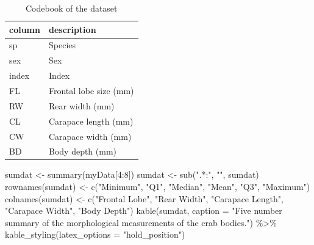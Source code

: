 \documentclass[
]{article}
\newenvironment{Shaded}{}{}
\newcommand{\AttributeTok}[1]{#1}
\newcommand{\DecValTok}[1]{#1}
\newcommand{\FunctionTok}[1]{#1}
\newcommand{\NormalTok}[1]{#1}
\newcommand{\OtherTok}[1]{\textcolor[rgb]{1.00,0.25,0.00}{#1}}
\newcommand{\SpecialCharTok}[1]{\textcolor[rgb]{0.00,0.50,0.50}{#1}}
\newcommand{\StringTok}[1]{\textcolor[rgb]{0.00,0.50,0.50}{#1}}
\begin{document}
\begin{table}[!h]

\caption{\label{tab:codebook}Codebook of the dataset}
\centering
\fontsize{10}{12}\selectfont
\begin{tabular}[t]{l|l}
\hline
column & description\\
\hline
sp & Species\\
\hline
sex & Sex\\
\hline
index & Index\\
\hline
FL & Frontal lobe size (mm)\\
\hline
RW & Rear width (mm)\\
\hline
CL & Carapace length (mm)\\
\hline
CW & Carapace width (mm)\\
\hline
BD & Body depth (mm)\\
\hline
\end{tabular}
\end{table}

\begin{Shaded}
\begin{Highlighting}[]
\NormalTok{sumdat }\OtherTok{\textless{}{-}} \FunctionTok{summary}\NormalTok{(myData[}\DecValTok{4}\SpecialCharTok{:}\DecValTok{8}\NormalTok{])}
\NormalTok{sumdat }\OtherTok{\textless{}{-}} \FunctionTok{sub}\NormalTok{(}\StringTok{".*:"}\NormalTok{, }\StringTok{""}\NormalTok{, sumdat)}
\FunctionTok{rownames}\NormalTok{(sumdat) }\OtherTok{\textless{}{-}}  \FunctionTok{c}\NormalTok{(}\StringTok{"Minimum"}\NormalTok{, }\StringTok{"Q1"}\NormalTok{, }\StringTok{"Median"}\NormalTok{, }\StringTok{"Mean"}\NormalTok{, }\StringTok{"Q3"}\NormalTok{, }\StringTok{"Maximum"}\NormalTok{)}
\FunctionTok{colnames}\NormalTok{(sumdat) }\OtherTok{\textless{}{-}} \FunctionTok{c}\NormalTok{(}\StringTok{"Frontal Lobe"}\NormalTok{, }\StringTok{"Rear Width"}\NormalTok{, }\StringTok{"Carapace Length"}\NormalTok{, }\StringTok{"Carapace Width"}\NormalTok{, }\StringTok{"Body Depth"}\NormalTok{)}
\FunctionTok{kable}\NormalTok{(sumdat, }\AttributeTok{caption =} \StringTok{"Five number summary of the morphological measurements of the crab bodies."}\NormalTok{) }\SpecialCharTok{\%\textgreater{}\%} 
\FunctionTok{kable\_styling}\NormalTok{(}\AttributeTok{latex\_options =} \StringTok{"hold\_position"}\NormalTok{)}
\end{Highlighting}
\end{Shaded}
\end{document}
